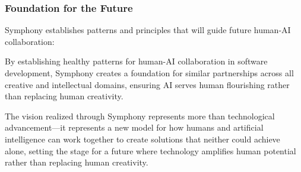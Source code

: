 \subsubsection{Foundation for the Future}

Symphony establishes patterns and principles that will guide future human-AI collaboration:

\begin{successbox}
By establishing healthy patterns for human-AI collaboration in software development, Symphony creates a foundation for similar partnerships across all creative and intellectual domains, ensuring AI serves human flourishing rather than replacing human creativity.
\end{successbox}

The vision realized through Symphony represents more than technological advancement—it represents a new model for how humans and artificial intelligence can work together to create solutions that neither could achieve alone, setting the stage for a future where technology amplifies human potential rather than replacing human creativity.
